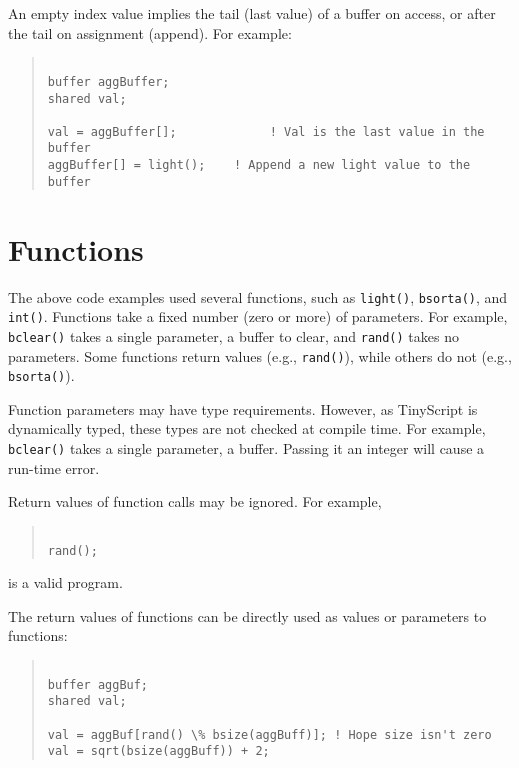 \documentclass[12pt]{article}
\begin{document}
An empty index value implies the tail (last value) of a buffer on
access, or after the tail on assignment (append). For example:

\begin{quotation}
\begin{verbatim}

buffer aggBuffer;
shared val;

val = aggBuffer[];             ! Val is the last value in the buffer
aggBuffer[] = light();    ! Append a new light value to the buffer

\end{verbatim}
\end{quotation}

\section{Functions}

The above code examples used several functions, such as {\tt light()},
{\tt bsorta()}, and {\tt int()}. Functions take a fixed number (zero
or more) of parameters. For example, {\tt bclear()} takes a single
parameter, a buffer to clear, and {\tt rand()} takes no
parameters. Some functions return values (e.g., {\tt rand()}), while
others do not (e.g., {\tt bsorta()}).

Function parameters may have type requirements. However, as TinyScript
is dynamically typed, these types are not checked at compile time. For
example, {\tt bclear()} takes a single parameter, a buffer. Passing it
an integer will cause a run-time error.

Return values of function calls may be ignored. For example,

\begin{quotation}
\begin{verbatim}

rand();

\end{verbatim}
\end{quotation}

is a valid program.

The return values of functions can be directly used as values or
parameters to functions:

\begin{quotation}
\begin{verbatim}

buffer aggBuf;
shared val;

val = aggBuf[rand() \% bsize(aggBuff)]; ! Hope size isn't zero
val = sqrt(bsize(aggBuff)) + 2;         
\end{verbatim}
\end{quotation}
\end{document}
